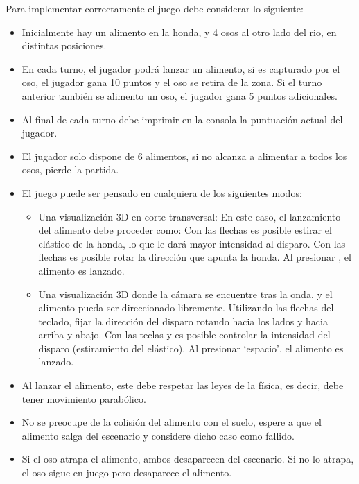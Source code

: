 \documentclass[letterpaper,11pt]{article} %
\begin{document}
Para implementar correctamente el juego debe considerar lo siguiente:

\begin{itemize}
	\item Inicialmente hay un alimento en la honda, y 4 osos al otro lado del rio, en distintas posiciones.
	\item En cada turno, el jugador podrá lanzar un alimento, si es capturado por el oso, el jugador gana 10 puntos y el oso se retira de la zona. Si el turno anterior también se alimento un oso, el jugador gana 5 puntos adicionales.
	\item Al final de cada turno debe imprimir en la consola la puntuación actual del jugador.
	\item El jugador solo dispone de 6 alimentos, si no alcanza a alimentar a todos los osos, pierde la partida.
	\item El juego puede ser pensado en cualquiera de los siguientes modos:
	\begin{itemize}
		\item Una visualización 3D en corte transversal: En este caso, el lanzamiento del alimento debe proceder como: Con las flechas es posible estirar el elástico de la honda, lo que le dará mayor intensidad al disparo. Con las flechas es posible rotar la dirección que apunta la honda. Al presionar , el alimento es lanzado.
		
		\item Una visualización 3D donde la cámara se encuentre tras la onda, y el alimento pueda ser direccionado libremente. Utilizando las flechas del teclado, fijar la dirección del disparo rotando hacia los lados y hacia arriba y abajo. Con las teclas  y  es posible controlar la intensidad del disparo (estiramiento del elástico). Al presionar ‘espacio’, el alimento es lanzado.
	\end{itemize}

	\item Al lanzar el alimento, este debe respetar las leyes de la física, es decir, debe tener movimiento parabólico.
	\item No se preocupe de la colisión del alimento con el suelo, espere a que el alimento salga del escenario y considere dicho caso como fallido.
	\item Si el oso atrapa el alimento, ambos desaparecen del escenario. Si no lo atrapa, el oso sigue en juego pero desaparece el alimento.
\end{itemize}
\end{document}
